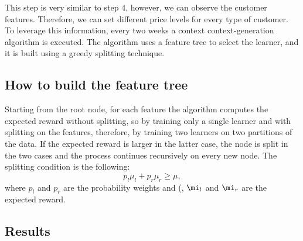 This step is very similar to step 4, however, we can observe the customer features.
Therefore, we can set different price levels for every type of customer.
To leverage this information, every two weeks a context context-generation algorithm is executed.
The algorithm uses a feature tree to select the learner, and it is built using a greedy splitting technique.

\subsection{How to build the feature tree}
Starting from the root node, for each feature the algorithm computes the expected reward without splitting, so by training only a single learner and with splitting on the features, therefore, by training two learners on two partitions of the data.
If the expected reward is larger in the latter case, the node is split in the two cases and the process continues recursively on every new node.
The splitting condition is the following:
\begin{equation}
    p_l\mu_l + p_r \mu_r \geq \mu,
\end{equation}
where \(p_l\) and \(p_r\) are the probability weights and (\mi\), \(\mi_l\) and \(\mi_r\) are the expected reward.

\subsection{Results}
